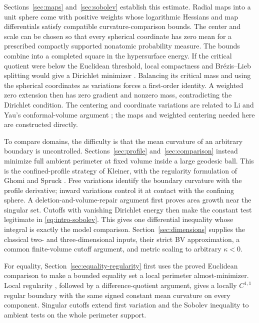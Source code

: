 Sections~\ref{sec:maps} and~\ref{sec:sobolev} establish this estimate.
Radial maps into a unit sphere come with positive weights whose
logarithmic Hessians and map differentials satisfy compatible
curvature-comparison bounds. The center and scale can be chosen so
that every spherical coordinate has zero mean for a prescribed
compactly supported nonatomic probability measure. The bounds combine
into a completed square in the hypersurface energy.
If the critical quotient were below the Euclidean threshold, local
compactness and Br\'ezis--Lieb splitting would give a Dirichlet
minimizer \cite{BrezisLieb1983}. Balancing its critical mass and using
the spherical coordinates as variations forces a first-order identity.
A weighted zero extension then has zero gradient and nonzero mass,
contradicting the Dirichlet condition. The centering and coordinate
variations are related to Li and Yau's conformal-volume argument
\cite[proof of Theorem~1]{LiYau1982}; the maps and weighted centering
needed here are constructed directly.

To compare domains, the difficulty is that the mean curvature of an
arbitrary boundary is uncontrolled. Sections~\ref{sec:profile}
and~\ref{sec:comparison} instead minimize full ambient perimeter at
fixed volume inside a large geodesic ball. This is the confined-profile
strategy of Kleiner, with the regularity formulation of Ghomi and Spruck
\cite{Kleiner1992,GhomiSpruck2022}. Free variations identify the
boundary curvature with the profile derivative; inward variations
control it at contact with the confining sphere. A deletion-and-volume-repair argument first proves area growth near the singular set.
Cutoffs with vanishing Dirichlet energy then make the constant test
legitimate in \eqref{eq:intro-sobolev}. This gives one differential
inequality whose integral is exactly the model comparison.
Section~\ref{sec:dimensions} supplies the classical two- and
three-dimensional inputs, their strict BV approximation, a common
finite-volume cutoff argument, and metric scaling to arbitrary
$\kappa<0$.

For equality, Section~\ref{sec:equality-regularity} first uses the
proved Euclidean comparison to make a bounded equality set a local
perimeter almost-minimizer. Local regularity
\cite[Corollary~1.6]{AntonelliPasqualettoPozzetta2022}, followed by a
difference-quotient argument, gives a locally $C^{1,1}$ regular
boundary with the same signed constant mean curvature on every
component. Singular cutoffs extend first variation and the Sobolev
inequality to ambient tests on the whole perimeter support.

